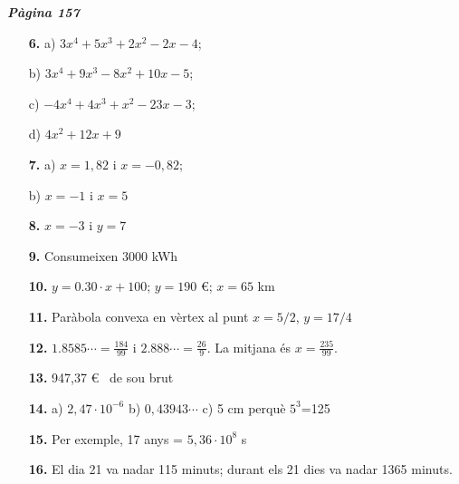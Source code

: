 \documentclass[a4paper, pdf, twoside]{book}
\begin{document}
\begin{multicols}{2}
{\textbf{\em Pàgina 157}} \hrulefill
\begin{enumerate}
\vspace{0.25cm}
\item[\fontfamily{phv}\selectfont\color{blue}\textbf{6. }]  \scalebox{0.6}{\simbolclau } 
 a) $3x^4+5x^3+2x^2-2x-4$; \par b) $3x^4+9x^3-8x^2+10x-5$; \par c) $-4x^4+4x^3+x^2-23x-3$; \par d) $4x^2+12x+9$
 \end{enumerate}
\begin{enumerate}
\vspace{0.25cm}
\item[\fontfamily{phv}\selectfont\color{blue}\textbf{7. }]  \scalebox{0.6}{\simbolclau } 
 a) $x=1,82$ i $x=-0,82$; \par b) $x=-1$ i $x=5$
\vspace{0.25cm}
\item[\fontfamily{phv}\selectfont\color{blue}\textbf{8. }]  \scalebox{0.6}{\simbolclau } 
 $x=-3$ i $y=7$
\vspace{0.25cm}
\item[\fontfamily{phv}\selectfont\color{blue}\textbf{9. }]  \scalebox{0.6}{\simbolclau } 
 Consumeixen $3000$ kWh
\vspace{0.25cm}
\item[\fontfamily{phv}\selectfont\color{blue}\textbf{10. }]  \scalebox{0.6}{\simbolclau } 
 $y=0.30 \cdot x + 100$; \quad $y=190$ €; \quad $x=65$ km
\vspace{0.25cm}
\item[\fontfamily{phv}\selectfont\color{blue}\textbf{11. }]  \scalebox{0.6}{\simbolclau } 
 Paràbola convexa en vèrtex al punt $x=5/2$, $y=17/4$
\vspace{0.25cm}
\item[\fontfamily{phv}\selectfont\color{blue}\textbf{12. }]  \scalebox{0.6}{\simbolclau } 
 $1.8585\cdots = \frac {184}{99}$ i $2.888 \cdots = \frac {26}{9}$. La mitjana és $x=\frac {235}{99}$. 
\vspace{0.25cm}
\item[\fontfamily{phv}\selectfont\color{blue}\textbf{13. }]  \scalebox{0.6}{\simbolclau } 
 947,37 \euro {} \ de sou brut
\vspace{0.25cm}
\item[\fontfamily{phv}\selectfont\color{blue}\textbf{14. }]  \scalebox{0.6}{\simbolclau } 
 a) $2,47\cdot 10^{-6}$ \quad b) $0,43943\cdots $ \quad c) 5 cm perquè $5^{3}$=125
\vspace{0.25cm}
\item[\fontfamily{phv}\selectfont\color{blue}\textbf{15. }]  \scalebox{0.6}{\simbolclau } 
 Per exemple, 17 anys = $5,36\cdot 10^{8}$ s
\vspace{0.25cm}
\item[\fontfamily{phv}\selectfont\color{blue}\textbf{16. }]  \scalebox{0.6}{\simbolclau } 
El dia 21 va nadar 115 minuts; durant els 21 dies va nadar 1365 minuts.
 \end{enumerate}
\vspace{0.3cm}


\end{multicols}
\end{document}
